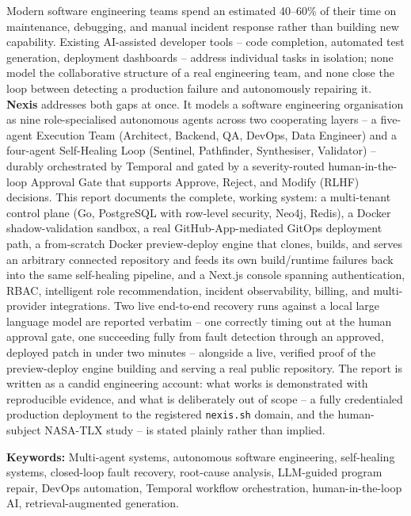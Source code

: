 Modern software engineering teams spend an estimated 40--60\% of their time on
maintenance, debugging, and manual incident response rather than building new
capability. Existing AI-assisted developer tools -- code completion, automated
test generation, deployment dashboards -- address individual tasks in
isolation; none model the collaborative structure of a real engineering team,
and none close the loop between detecting a production failure and
autonomously repairing it. \textbf{Nexis} addresses both gaps at once. It
models a software engineering organisation as nine role-specialised
autonomous agents across two cooperating layers -- a five-agent Execution
Team (Architect, Backend, QA, DevOps, Data Engineer) and a four-agent
Self-Healing Loop (Sentinel, Pathfinder, Synthesiser, Validator) -- durably
orchestrated by Temporal and gated by a severity-routed human-in-the-loop
Approval Gate that supports Approve, Reject, and Modify (RLHF) decisions.
This report documents the complete, working system: a multi-tenant control
plane (Go, PostgreSQL with row-level security, Neo4j, Redis), a Docker
shadow-validation sandbox, a real GitHub-App-mediated GitOps deployment path,
a from-scratch Docker preview-deploy engine that clones, builds, and serves an
arbitrary connected repository and feeds its own build/runtime failures back
into the same self-healing pipeline, and a Next.js console spanning
authentication, RBAC, intelligent role recommendation, incident observability,
billing, and multi-provider integrations. Two live end-to-end recovery runs
against a local large language model are reported verbatim -- one correctly
timing out at the human approval gate, one succeeding fully from fault
detection through an approved, deployed patch in under two minutes -- alongside
a live, verified proof of the preview-deploy engine building and serving a
real public repository. The report is written as a candid engineering account:
what works is demonstrated with reproducible evidence, and what is
deliberately out of scope -- a fully credentialed production deployment to the
registered \texttt{nexis.sh} domain, and the human-subject NASA-TLX study --
is stated plainly rather than implied.

\vspace{10pt}
\textbf{Keywords:} Multi-agent systems, autonomous software engineering,
self-healing systems, closed-loop fault recovery, root-cause analysis,
LLM-guided program repair, DevOps automation, Temporal workflow orchestration,
human-in-the-loop AI, retrieval-augmented generation.
